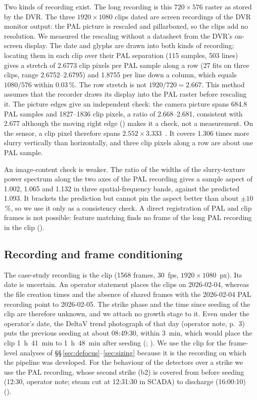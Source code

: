 Two kinds of recording exist. The long recording  is this $720 \times 576$ raster as
stored by the DVR. The three $1920 \times 1080$ clips dated  are screen recordings of the DVR
monitor output: the PAL picture is rescaled and pillarboxed, so the clips add no resolution. We measured the
rescaling without a datasheet from the DVR's on-screen display. The date and  glyphs are drawn into both
kinds of recording; locating them in each clip over their PAL separation (115 samples, 503 lines) gives a stretch
of 2.6773 clip pixels per PAL sample along a row (27 fits on three clips, range 2.6752--2.6795) and 1.8755 per line
down a column, which equals $1080/576$ within 0.03\,\%. The row stretch is not $1920/720 = 2.667$. This method
assumes that the recorder draws its display into the PAL raster before rescaling it. The picture edges give an
independent check: the camera picture spans 684.8 PAL samples and 1827--1836 clip pixels, a ratio of 2.668--2.681,
consistent with 2.677 although the moving right edge () makes it a check, not a measurement. On the sensor, a
clip pixel therefore spans $2.552 \times 3.333$~\um. It covers 1.306 times more slurry vertically than horizontally,
and three clip pixels along a row are about one PAL sample.

An image-content check is weaker. The ratio of the widths of the slurry-texture power spectrum along the two axes
of the PAL recording gives a sample aspect of 1.002, 1.065 and 1.132 in three spatial-frequency bands, against the
predicted 1.093. It brackets the prediction but cannot pin the aspect better than about $\pm 10$\,\%, so we use it
only as a consistency check. A direct registration of PAL and clip frames is not possible: feature matching finds no
frame of the long PAL recording in the clip  ().

\subsection{Recording and frame conditioning}\label{sec:recording}

The case-study recording is the clip  (1568 frames, 30~fps, $1920 \times 1080$~px).
Its date is uncertain. An operator statement places the clips on 2026-02-04, whereas the file creation times and the
absence of shared frames with the 2026-02-04 PAL recording point to 2026-02-05. The strike phase and the time since
seeding of the clip are therefore unknown, and we attach no growth stage to it. Even under the operator's date, the
DeltaV trend photograph of that day (operator note, p.~3) puts the previous seeding at about 08:49:30, within
3~min, which would place the clip 1~h~41~min to 1~h~48~min after seeding (;
). We use the clip for the frame-level analyses of \S\S\,\ref{sec:defocus}--\ref{sec:sizing}
because it is the recording on which the pipeline was developed. For the behaviour of the detectors over a strike we
use the PAL recording, whose second strike (b2) is covered from before seeding (12:30, operator note; steam cut at
12:31:30 in SCADA) to discharge (16:00:10) ().

